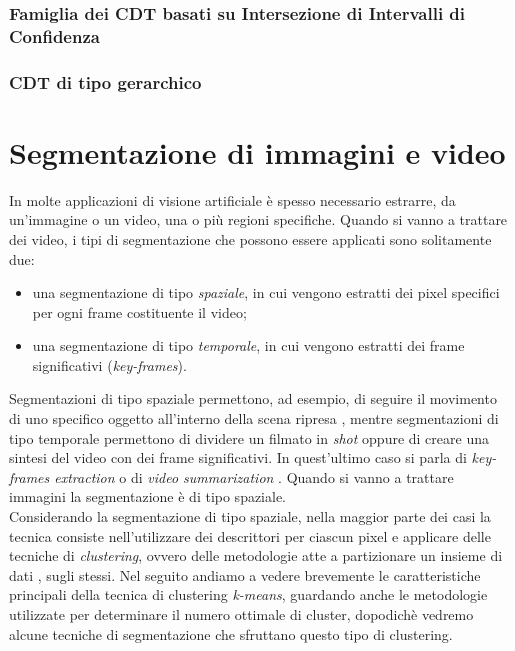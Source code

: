			        \subsubsection{Famiglia dei CDT basati
                                  su Intersezione di Intervalli di
                                  Confidenza}
                                
                                \subsubsection{CDT di tipo gerarchico}

	\section{Segmentazione di immagini e video}
	In molte applicazioni di visione artificiale \`e spesso necessario estrarre, da un'immagine o un video, una o pi\`u regioni specifiche. Quando si vanno a trattare dei video, i tipi di segmentazione che possono essere applicati sono solitamente due:
		\begin{itemize}      
			\item una segmentazione di tipo \textit{spaziale}, in cui vengono estratti dei pixel specifici per ogni frame costituente il video;
			\item una segmentazione di tipo \textit{temporale}, in cui vengono estratti dei frame 			significativi (\textit{key-frames}).
	\end{itemize}
	Segmentazioni di tipo spaziale permettono, ad esempio, di seguire il movimento di uno specifico oggetto all'interno della scena ripresa \cite{kim2003efficient}, mentre segmentazioni di tipo temporale permettono di dividere un filmato in \textit{shot} oppure di creare una sintesi del video con dei frame significativi. In quest'ultimo caso si parla di \textit{key-frames extraction} o di \textit{video summarization} \cite{gong2000video,jiang2009hierarchical,sentinelli2014live,wolf1996key}. Quando si vanno a trattare immagini la segmentazione \`e di tipo spaziale.\\
	Considerando la segmentazione di tipo spaziale, nella maggior parte dei casi la tecnica consiste nell'utilizzare dei descrittori per ciascun pixel e applicare delle tecniche di \textit{clustering}, ovvero delle metodologie atte a partizionare un insieme di dati \cite{han2006data}, sugli stessi. Nel seguito andiamo a vedere brevemente le caratteristiche principali della tecnica di clustering \textit{k-means}, guardando anche le metodologie utilizzate per determinare il numero ottimale di cluster, dopodich\`e vedremo alcune tecniche di segmentazione che sfruttano questo tipo di clustering.
